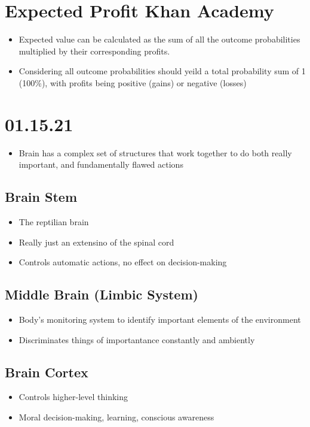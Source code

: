 \documentclass[11pt]{article}
\begin{document}
\section{Expected Profit Khan Academy}
\label{sec:org54a9192}
\begin{itemize}
\item Expected value can be calculated as the sum of all the outcome probabilities multiplied by their corresponding profits.
\item Considering all outcome probabilities should yeild a total probability sum of 1 (100\%), with profits being positive (gains) or negative (losses)
\end{itemize}
\section{01.15.21}
\label{sec:org3c24b88}
\begin{itemize}
\item Brain has a complex set of structures that work together to do both really important, and fundamentally flawed actions
\end{itemize}
\subsection{Brain Stem}
\label{sec:org24316d2}
\begin{itemize}
\item The reptilian brain
\item Really just an extensino of the spinal cord
\item Controls automatic actions, no effect on decision-making
\end{itemize}
\subsection{Middle Brain (Limbic System)}
\label{sec:org5667561}
\begin{itemize}
\item Body's monitoring system to identify important elements of the environment
\item Discriminates things of importantance constantly and ambiently
\end{itemize}
\subsection{Brain Cortex}
\label{sec:org5e62155}
\begin{itemize}
\item Controls higher-level thinking
\item Moral decision-making, learning, conscious awareness
\end{itemize}
\end{document}
